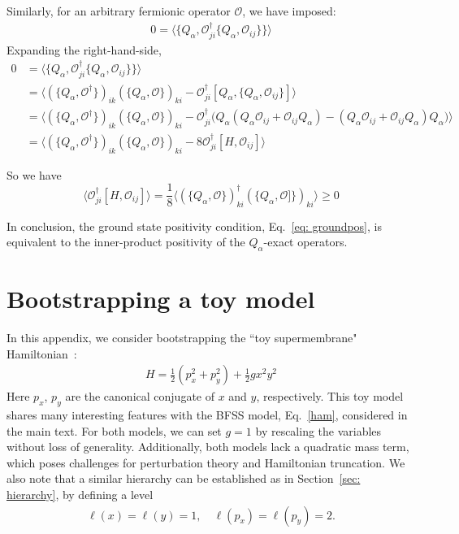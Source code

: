 \documentclass[11pt]{article}
\renewcommand{\ev}[1]{\langle #1 \rangle} %
\begin{document}
Similarly, for an arbitrary fermionic operator $\mathcal{O}$, we have imposed:
\begin{equation}
    \begin{split}
        0=\ev{\{Q_\alpha, \mathcal{O}_{ji}^\dagger \{Q_\alpha, \mathcal{O}_{ij}\}\}}
    \end{split}
\end{equation}
Expanding the right-hand-side,
\begin{equation}
    \begin{split}
        0&=\ev{\{Q_\alpha, \mathcal{O}_{ji}^\dagger \{Q_\alpha, \mathcal{O}_{ij}\}\}}\\
&=\ev{(\{Q_\alpha, \mathcal{O}^\dagger\})_{ik}(\{Q_\alpha, \mathcal{O}\})_{ki}-\mathcal{O}_{ji}^\dagger [Q_{\alpha},\{Q_\alpha, \mathcal{O}_{ij}\}]}\\
&=\ev{(\{Q_\alpha, \mathcal{O}^\dagger\})_{ik}(\{Q_\alpha, \mathcal{O}\})_{ki}-\mathcal{O}_{ji}^\dagger\big( Q_\alpha(Q_\alpha \mathcal{O}_{ij}+ \mathcal{O}_{ij} Q_\alpha)-(Q_\alpha \mathcal{O}_{ij}+ \mathcal{O}_{ij} Q_\alpha) Q_\alpha \big)}\\
&=\ev{(\{Q_\alpha, \mathcal{O}^\dagger\})_{ik}(\{Q_\alpha, \mathcal{O}\})_{ki}-8 \mathcal{O}_{ji}^\dagger [H, \mathcal{O}_{ij}]}
    \end{split}
\end{equation}

So we have 
\begin{equation}
    \ev{\mathcal{O}_{ji}^\dagger [H, \mathcal{O}_{ij}]}=\frac{1}{8}\ev{(\{Q_\alpha, \mathcal{O}\})_{ki}^\dagger(\{Q_\alpha, \mathcal{O}]\})_{ki}}\geq 0
\end{equation}

In conclusion, the ground state positivity condition, Eq.~\eqref{eq: groundpos}, is equivalent to the inner-product positivity of the $Q_\alpha$-exact operators.

\section{Bootstrapping a toy model \label{app: toy}}
In this appendix, we consider bootstrapping the ``toy supermembrane" Hamiltonian~\cite{deWit:1988xki, Frohlich:1999zf, Balthazar:2016utu, Komatsu:2024vnb}:
\begin{align}\label{eq: toyH}
    H = \frac{1}{2}(p_x^2 + p_y^2) + \frac{1}{2} g x^2 y^2
\end{align}
Here $p_x$, $p_y$ are the canonical conjugate of $x$ and $y$, respectively. This toy model shares many interesting features with the BFSS model, Eq.~\eqref{ham}, considered in the main text. For both models, we can set $g = 1$ by rescaling the variables without loss of generality. Additionally, both models lack a quadratic mass term, which poses challenges for perturbation theory and Hamiltonian truncation. We also note that a similar hierarchy can be established as in Section~\ref{sec: hierarchy}, by defining a level 
\begin{equation}
    \begin{split}
        \ell(x)=\ell(y)=1,\quad \ell(p_x)=\ell(p_y)=2.
    \end{split}
\end{equation}
\end{document}
